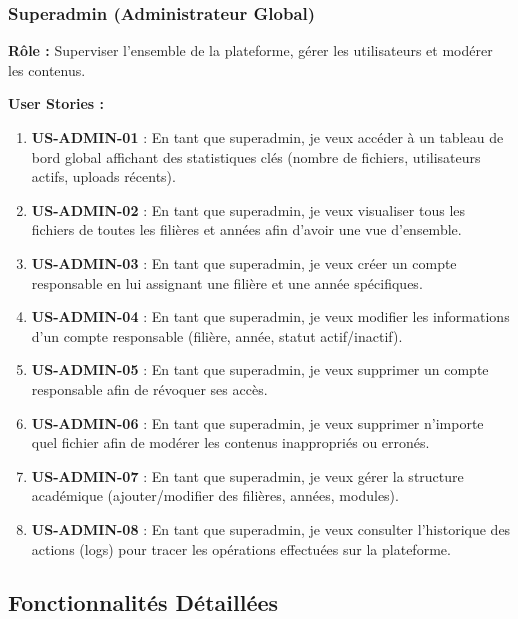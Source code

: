 \documentclass[12pt,a4paper]{article}
\begin{document}
\subsubsection{Superadmin (Administrateur Global)}

\textbf{Rôle :} Superviser l'ensemble de la plateforme, gérer les utilisateurs et modérer les contenus.

\textbf{User Stories :}
\begin{enumerate}[leftmargin=*]
    \item \textbf{US-ADMIN-01} : En tant que superadmin, je veux accéder à un tableau de bord global affichant des statistiques clés (nombre de fichiers, utilisateurs actifs, uploads récents).
    
    \item \textbf{US-ADMIN-02} : En tant que superadmin, je veux visualiser tous les fichiers de toutes les filières et années afin d'avoir une vue d'ensemble.
    
    \item \textbf{US-ADMIN-03} : En tant que superadmin, je veux créer un compte responsable en lui assignant une filière et une année spécifiques.
    
    \item \textbf{US-ADMIN-04} : En tant que superadmin, je veux modifier les informations d'un compte responsable (filière, année, statut actif/inactif).
    
    \item \textbf{US-ADMIN-05} : En tant que superadmin, je veux supprimer un compte responsable afin de révoquer ses accès.
    
    \item \textbf{US-ADMIN-06} : En tant que superadmin, je veux supprimer n'importe quel fichier afin de modérer les contenus inappropriés ou erronés.
    
    \item \textbf{US-ADMIN-07} : En tant que superadmin, je veux gérer la structure académique (ajouter/modifier des filières, années, modules).
    
    \item \textbf{US-ADMIN-08} : En tant que superadmin, je veux consulter l'historique des actions (logs) pour tracer les opérations effectuées sur la plateforme.
\end{enumerate}

\subsection{Fonctionnalités Détaillées}
\end{document}
